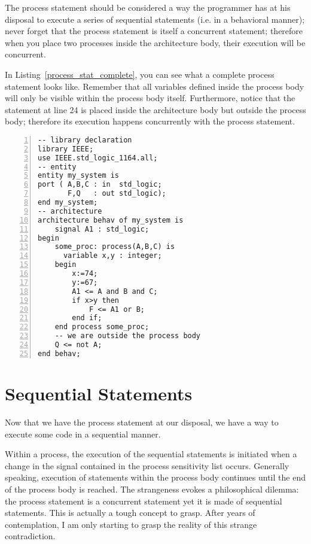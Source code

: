 The process statement should be considered a way the programmer has at his disposal to execute a series of sequential statements (i.e. in a behavioral manner); never forget that the process statement is itself a concurrent statement; therefore when you place two processes inside the architecture body, their execution will be concurrent.

In Listing~\ref{process_stat_complete}, you can see what a complete process statement looks like. Remember that all variables defined inside the process body will only be visible within the process body itself. Furthermore, notice that the statement at line 24 is placed inside the architecture body but outside the process body; therefore its execution happens concurrently with the process statement.

\begin{lstlisting}[float, numbers=left,label=process_stat_complete, caption=Use of the process statement.]
-- library declaration
library IEEE;
use IEEE.std_logic_1164.all;
-- entity
entity my_system is
port ( A,B,C : in  std_logic;
       F,Q   : out std_logic);
end my_system;
-- architecture
architecture behav of my_system is
	signal A1 : std_logic;
begin
	some_proc: process(A,B,C) is
	  variable x,y : integer;
	begin
		x:=74;
		y:=67;
		A1 <= A and B and C;
		if x>y then
            F <= A1 or B;
		end if;
	end process some_proc;
	-- we are outside the process body	
	Q <= not A;
end behav;
\end{lstlisting}

\section{Sequential Statements}
Now that we have the process statement at our disposal, we have a way to execute some code in a sequential manner.

Within a process, the execution of the sequential statements is initiated when a change in the signal contained in the process sensitivity list occurs. Generally speaking, execution of statements within the process body continues until the end of the process body is reached. The strangeness evokes a philosophical dilemma: the process statement is a concurrent statement yet it is made of sequential statements. This is actually a tough concept to grasp. After years of contemplation, I am only starting to grasp the reality of this strange contradiction. 

